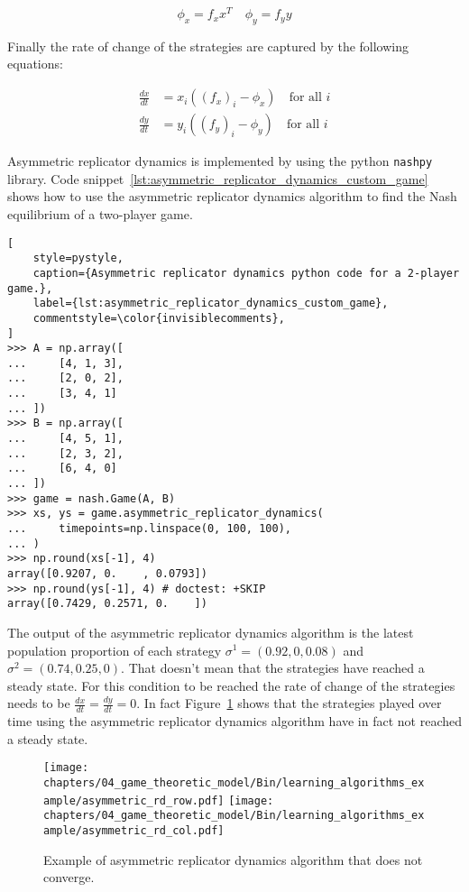 \begin{equation}\label{eq:average_fitness_definition}
    \phi_x = f_x x^T \quad \phi_y = f_y y
\end{equation}

Finally the rate of change of the strategies are captured by the following
equations:

\begin{align}\label{eq:replicator_dynamics}
    \frac{dx}{dt} &= x_i((f_x)_i - \phi_x) \quad \text{for all } i \\
    \frac{dy}{dt} &= y_i((f_y)_i - \phi_y) \quad \text{for all } i
\end{align}

Asymmetric replicator dynamics is implemented by using the python
\texttt{nashpy} library.
Code snippet~\ref{lst:asymmetric_replicator_dynamics_custom_game} shows how to
use the asymmetric replicator dynamics
algorithm to find the Nash equilibrium of a two-player game.

\begin{lstlisting}[
    style=pystyle,
    caption={Asymmetric replicator dynamics python code for a 2-player game.},
    label={lst:asymmetric_replicator_dynamics_custom_game},
    commentstyle=\color{invisiblecomments},
]
>>> A = np.array([
...     [4, 1, 3],
...     [2, 0, 2],
...     [3, 4, 1]
... ])
>>> B = np.array([
...     [4, 5, 1],
...     [2, 3, 2],
...     [6, 4, 0]
... ])
>>> game = nash.Game(A, B)
>>> xs, ys = game.asymmetric_replicator_dynamics(
...     timepoints=np.linspace(0, 100, 100),
... )
>>> np.round(xs[-1], 4)
array([0.9207, 0.    , 0.0793])
>>> np.round(ys[-1], 4) # doctest: +SKIP
array([0.7429, 0.2571, 0.    ])

\end{lstlisting}

The output of the asymmetric replicator dynamics algorithm is the latest
population proportion of each strategy \(\sigma^1 = (0.92, 0, 0.08)\) and
\(\sigma^2 = (0.74, 0.25, 0)\).
That doesn't mean that the strategies have reached a steady state.
For this condition to be reached the rate of change of the strategies needs to
be \(\frac{dx}{dt} = \frac{dy}{dt} = 0\).
In fact Figure~\ref{fig:asymmetric_replicator_dynamics} shows that the
strategies played over time using the asymmetric replicator dynamics algorithm
have in fact not reached a steady state.

\begin{figure}[H]
    \centering
    \texttt{[image: chapters/04\_game\_theoretic\_model/Bin/learning\_algorithms\_example/asymmetric\_rd\_row.pdf]}
    \texttt{[image: chapters/04\_game\_theoretic\_model/Bin/learning\_algorithms\_example/asymmetric\_rd\_col.pdf]}
    \caption{Example of asymmetric replicator dynamics algorithm that does
    not converge.}
    \label{fig:asymmetric_replicator_dynamics}
\end{figure}

